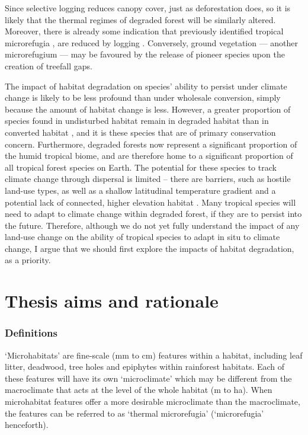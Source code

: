 \documentclass[12pt,a4paper,]{report}
\theoremstyle{definition}
\theoremstyle{definition}
\theoremstyle{definition}
\theoremstyle{remark}
\begin{document}
Since selective logging reduces canopy cover, just as deforestation
does, so it is likely that the thermal regimes of degraded forest will
be similarly altered. Moreover, there is already some indication that
previously identified tropical microrefugia \citep[in this case, leaf
litter and soil;][]{scheffers_microhabitats2014}, are reduced by logging
\citep{saner_reduced2009}. Conversely, ground vegetation --- another
microrefugium \citep{scheffers_microhabitats2014} --- may be favoured by
the release of pioneer species upon the creation of treefall gaps.

The impact of habitat degradation on species' ability to persist under
climate change is likely to be less profound than under wholesale
conversion, simply because the amount of habitat change is less.
However, a greater proportion of species found in undisturbed habitat
remain in degraded habitat than in converted habitat
\citep{edwards_degraded2011}, and it is these species that are of
primary conservation concern. Furthermore, degraded forests now
represent a significant proportion of the humid tropical biome, and are
therefore home to a significant proportion of all tropical forest
species on Earth. The potential for these species to track climate
change through dispersal is limited -- there are barriers, such as
hostile land-use types, as well as a shallow latitudinal temperature
gradient \citep{colwell_global2008} and a potential lack of connected,
higher elevation habitat \citep{scriven_protected2015}. Many tropical
species will need to adapt to climate change within degraded forest, if
they are to persist into the future. Therefore, although we do not yet
fully understand the impact of any land-use change on the ability of
tropical species to adapt in situ to climate change, I argue that we
should first explore the impacts of habitat degradation, as a priority.

\section{Thesis aims and rationale}\label{thesis-aims-and-rationale}

\subsubsection{Definitions}\label{definitions}

`Microhabitats' are fine-scale (mm to cm) features within a habitat,
including leaf litter, deadwood, tree holes and epiphytes within
rainforest habitats. Each of these features will have its own
`microclimate' which may be different from the macroclimate that acts at
the level of the whole habitat (m to ha). When microhabitat features
offer a more desirable microclimate than the macroclimate, the features
can be referred to as `thermal microrefugia' (`microrefugia'
henceforth).
\end{document}
